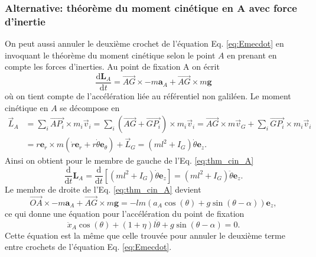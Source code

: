 \documentclass[11pt,a4paper]{exam}
\newcommand{\ezACDH}{\bm e_z}
\newcommand{\erACDH}{\bm e_r}
\newcommand{\etACDH}{\bm e_\theta}
\begin{document}
\begin{parts}
    \subsubsection*{Alternative: théorème du moment cinétique en A avec force d'inertie}
    On peut aussi annuler le deuxième crochet de l'équation Eq. \eqref{eq:Emecdot} en invoquant le théorème du moment cinétique selon le point $A$ en prenant en compte les forces d'inerties.
    Au point de fixation A on écrit
    \begin{equation}
        \frac{\mathrm d \bm{L}_A}{\mathrm d t} = \overrightarrow{AG}\times-m\bm a_A + \overrightarrow{AG}\times m\bm g
        \label{eq:thm_cin_A}
    \end{equation}
    où on tient compte de l'accélération liée au référentiel non galiléen.
    Le moment cinétique en $A$ se décompose en
    \begin{align*}
        \vec L_A &= \sum_i \overrightarrow{AP_i}\times m_i \vec v_i = \sum_i \left(\overrightarrow{AG}+\overrightarrow{GP_i}\right)\times m_i \vec v_i = \overrightarrow{AG}\times m \vec v_G + \sum_i\overrightarrow{GP_i}\times m_i \vec v_i \\
        &= r \erACDH \times m(\dot r \erACDH + r\dot\theta \etACDH) + \vec L_G = (ml^2 + I_G) \dot\theta \ezACDH.
    \end{align*}
    Ainsi on obtient pour le membre de gauche de l'Eq. \eqref{eq:thm_cin_A}
    $$
    \frac{\mathrm d }{\mathrm d t}\bm L_A = \frac{\mathrm d }{\mathrm d t}\left[\left(ml^2+I_G\right)\dot\theta\ezACDH\right] = \left(ml^2+I_G\right)\ddot\theta\ezACDH.
    $$
    Le membre de droite de l'Eq. \eqref{eq:thm_cin_A} devient
    $$
    \overrightarrow{OA}\times-m\bm a_A + \overrightarrow{AG}\times m\bm g=-lm(a_A\cos(\theta) + g\sin(\theta-\alpha))\ezACDH,
    $$
    ce qui donne une équation pour l'accélération du point de fixation
    \begin{equation}
        \ddot x_A \cos(\theta) + (1+\eta) l \ddot\theta + g\sin(\theta-\alpha) = 0.
        \label{eq:a_A}
    \end{equation}
    Cette équation est la même que celle trouvée pour annuler le deuxième terme entre crochets de l'équation Eq. \eqref{eq:Emecdot}.

\end{parts}
\end{document}
